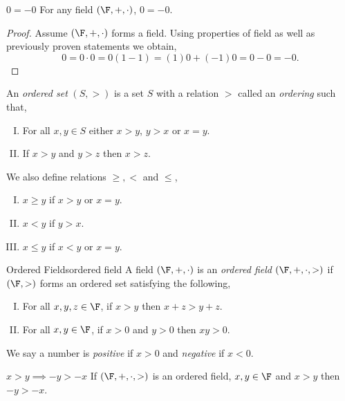 \documentclass{report}
\begin{document}
\begin{lemma}{$0 = -0$}{}
  For any field $\left(\F, +, \cdot\right)$, $0 = -0$.
\end{lemma}

\begin{proof}
  Assume $\left(\F, +, \cdot\right)$ forms a field.
  Using properties of field as well as previously proven statements we obtain,
  $$0 = 0 \cdot 0 = 0(1 - 1) = (1)0 + (-1)0 = 0 - 0 = -0.$$
\end{proof}

\begin{definition}{}{}
  An \emph{ordered set} $\left(S, >\right)$ is a set $S$ with a relation $>$ called an \emph{ordering} such that,
  \begin{enumerate}[I.]
    \item For all $x, y \in S$ either $x > y$, $y > x$ or $x = y$.
    \item If $x > y$ and $y > z$ then $x > z$.
  \end{enumerate}
  We also define relations $\geq, <$ and $\leq$,
  \begin{enumerate}[I.]
    \item $x \geq y$ if $x > y$ or $x = y$.
    \item $x < y$ if $y > x$.
    \item $x \leq y$ if $x < y$ or $x = y$.
  \end{enumerate}
\end{definition}

\begin{definition}{Ordered Fields}{ordered field}
  A field $\left(\F, +, \cdot\right)$ is an \emph{ordered field} $\left(\F, +, \cdot, > \right)$ if $\left(\F, >\right)$ forms an ordered set satisfying the following,
  \begin{enumerate}[I.]
    \item For all $x,y,z \in \F$, if $x > y$ then $x + z > y + z$.
    \item For all $x,y \in \F$, if $x > 0$ and $y > 0$ then $xy > 0$.
  \end{enumerate}
\end{definition}

\begin{notation}{}{}
  We say a number is \emph{positive} if $x > 0$ and \emph{negative} if $x < 0$.
\end{notation}

\begin{lemma}{$x > y \implies -y > -x$}{}
  If $\left(\F, +, \cdot, >\right)$ is an ordered field, $x, y \in \F$ and $x > y$ then $-y > -x$.
\end{lemma}
\end{document}
